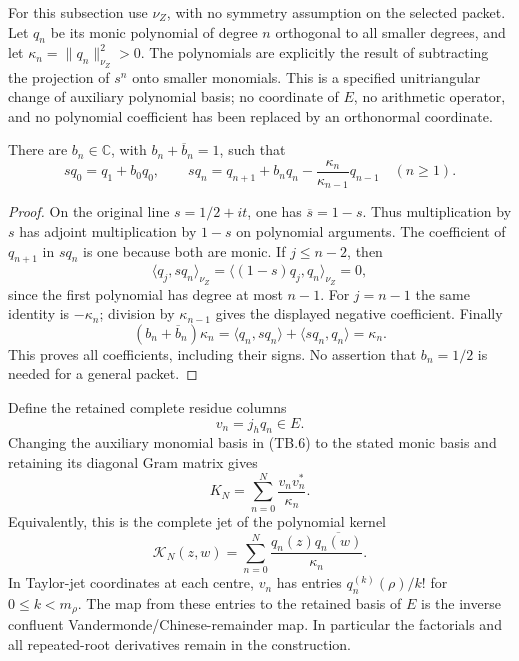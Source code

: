 For this subsection use \(\nu_Z\), with no symmetry assumption on
the selected packet.  Let \(q_n\) be its monic polynomial of degree
\(n\) orthogonal to all smaller degrees, and let
\(\kappa_n=\|q_n\|_{\nu_Z}^2>0\).
The polynomials are explicitly the result of subtracting the
projection of \(s^n\) onto smaller monomials.  This is a specified
unitriangular change of auxiliary polynomial basis; no coordinate
of \(E\), no arithmetic operator, and no polynomial coefficient
has been replaced by an orthonormal coordinate.

\begin{lemma}
There are \(b_n\in\mathbb C\), with \(b_n+\overline b_n=1\), such that
\[
 s q_0=q_1+b_0q_0,\qquad
 s q_n=q_{n+1}+b_nq_n-\frac{\kappa_n}{\kappa_{n-1}}q_{n-1}
 \quad(n\geq1).
 \tag{TB.12}
\]
\end{lemma}

\begin{proof}
On the original line \(s=1/2+it\), one has \(\overline s=1-s\).
Thus multiplication by \(s\) has adjoint multiplication by \(1-s\)
on polynomial arguments.  The coefficient of \(q_{n+1}\) in
\(sq_n\) is one because both are monic.  If \(j\leq n-2\), then
\[
 \langle q_j,sq_n\rangle_{\nu_Z}
 =\langle(1-s)q_j,q_n\rangle_{\nu_Z}=0,
\]
since the first polynomial has degree at most \(n-1\).
For \(j=n-1\) the same identity is \(-\kappa_n\);
division by \(\kappa_{n-1}\) gives the displayed negative coefficient.
Finally
\[
 (b_n+\overline b_n)\kappa_n
 =\langle q_n,sq_n\rangle+
   \langle sq_n,q_n\rangle=\kappa_n.
 \]
This proves all coefficients, including their signs.  No assertion
that \(b_n=1/2\) is needed for a general packet.
\end{proof}

Define the retained complete residue columns
\[
 v_n=j_hq_n\in E.
 \tag{TB.13}
\]
Changing the auxiliary monomial basis in (TB.6) to the stated
monic basis and retaining its diagonal Gram matrix gives
\[
 K_N=\sum_{n=0}^N\frac{v_nv_n^*}{\kappa_n}.
 \tag{TB.14}
\]
Equivalently, this is the complete jet of the polynomial kernel
\[
 \mathcal K_N(z,w)=
 \sum_{n=0}^N\frac{q_n(z)\overline{q_n(w)}}{\kappa_n}.
 \tag{TB.15}
\]
In Taylor-jet coordinates at each centre, \(v_n\) has entries
\(q_n^{(k)}(\rho)/k!\) for \(0\leq k<m_\rho\).
The map from these entries to the retained basis of \(E\) is
the inverse confluent Vandermonde/Chinese-remainder map.
In particular the factorials and all repeated-root derivatives
remain in the construction.

